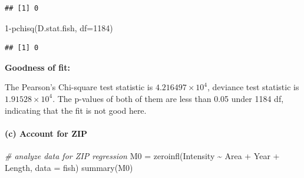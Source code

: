\documentclass[
]{article}
\newenvironment{Shaded}{\begin{snugshade}}{\end{snugshade}}
\newcommand{\AttributeTok}[1]{\textcolor[rgb]{0.77,0.63,0.00}{#1}}
\newcommand{\CommentTok}[1]{\textcolor[rgb]{0.56,0.35,0.01}{\textit{#1}}}
\newcommand{\DecValTok}[1]{\textcolor[rgb]{0.00,0.00,0.81}{#1}}
\newcommand{\FunctionTok}[1]{\textcolor[rgb]{0.00,0.00,0.00}{#1}}
\newcommand{\NormalTok}[1]{#1}
\newcommand{\OtherTok}[1]{\textcolor[rgb]{0.56,0.35,0.01}{#1}}
\newcommand{\SpecialCharTok}[1]{\textcolor[rgb]{0.00,0.00,0.00}{#1}}
\begin{document}
\begin{verbatim}
## [1] 0
\end{verbatim}

\begin{Shaded}
\begin{Highlighting}[]
\DecValTok{1}\SpecialCharTok{{-}}\FunctionTok{pchisq}\NormalTok{(D.stat.fish, }\AttributeTok{df=}\DecValTok{1184}\NormalTok{)}
\end{Highlighting}
\end{Shaded}

\begin{verbatim}
## [1] 0
\end{verbatim}

\textbf{Goodness of fit:}

The Pearson's Chi-square test statistic is
\ensuremath{4.216497\times 10^{4}}, deviance test statistic is
\ensuremath{1.91528\times 10^{4}}. The p-values of both of them are less
than 0.05 under 1184 df, indicating that the fit is not good here.

\hypertarget{c-account-for-zip}{%
\paragraph{(c) Account for ZIP}\label{c-account-for-zip}}

\begin{Shaded}
\begin{Highlighting}[]
\CommentTok{\# analyze data for ZIP regression}
\NormalTok{M0 }\OtherTok{=} \FunctionTok{zeroinfl}\NormalTok{(Intensity }\SpecialCharTok{\textasciitilde{}}\NormalTok{ Area }\SpecialCharTok{+}\NormalTok{ Year }\SpecialCharTok{+}\NormalTok{ Length, }\AttributeTok{data =}\NormalTok{ fish)}
\FunctionTok{summary}\NormalTok{(M0)}
\end{Highlighting}
\end{Shaded}
\end{document}
